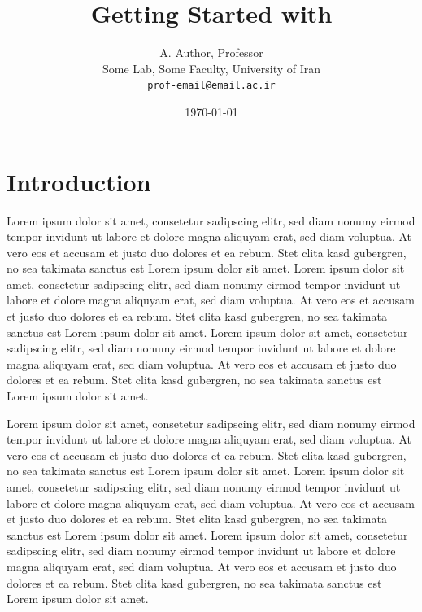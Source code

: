 \documentclass[12pt, a4paper, onecolumn]{article}
\begin{document}
	
	\title{Getting Started with \LaTeXe}
	
	\author{A. Author, Professor\\ Some Lab, Some Faculty, University of Iran\\ \texttt{prof-email@email.ac.ir}}
	
	\date{\today}
	
	\maketitle	
	\pagebreak
	
	\section{Introduction} \label{intro}
		Lorem ipsum dolor sit amet, consetetur sadipscing elitr, sed diam nonumy eirmod tempor invidunt ut labore et dolore magna aliquyam erat, sed diam voluptua. At vero\cite{Green95, Markovski09} eos et accusam et justo duo dolores et ea rebum. Stet clita kasd gubergren, no sea takimata sanctus est Lorem ipsum dolor sit amet. Lorem ipsum dolor sit amet, consetetur sadipscing elitr, sed diam nonumy eirmod tempor invidunt ut labore et dolore magna aliquyam erat, sed diam voluptua. At vero eos et accusam et justo duo dolores et ea rebum. Stet clita kasd gubergren, no sea takimata sanctus est Lorem ipsum dolor sit amet. Lorem ipsum dolor sit amet, consetetur sadipscing elitr, sed diam nonumy eirmod tempor invidunt ut labore et dolore magna\cite{Markovski09} aliquyam erat, sed diam voluptua. At vero eos et accusam et justo duo dolores et ea rebum. Stet clita kasd gubergren, no sea takimata sanctus est Lorem ipsum dolor sit amet.
		
		Lorem ipsum dolor sit amet, consetetur sadipscing elitr, sed diam nonumy eirmod tempor invidunt ut labore et dolore magna aliquyam erat, sed diam voluptua. At vero eos et accusam et justo duo dolores et ea rebum. Stet clita kasd gubergren, no sea takimata sanctus est Lorem ipsum dolor sit amet. Lorem ipsum dolor sit amet, consetetur sadipscing elitr, sed diam nonumy eirmod tempor invidunt ut labore et dolore magna aliquyam erat, sed diam voluptua. At vero eos et accusam et justo duo\cite{Tierney94} dolores et ea rebum. Stet clita kasd gubergren, no sea takimata sanctus est\cite{Green95} Lorem ipsum dolor sit amet. Lorem ipsum dolor sit amet, consetetur sadipscing elitr, sed diam nonumy eirmod tempor invidunt ut labore et dolore magna aliquyam erat, sed diam voluptua. At vero eos et accusam et justo duo dolores et ea rebum. Stet clita kasd gubergren, no sea takimata sanctus est Lorem ipsum dolor sit amet.
		
\end{document}
